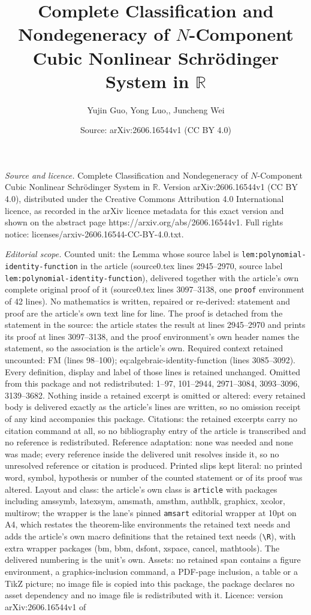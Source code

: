 \documentclass[10pt,a4paper]{amsart}
\title[Complete Classification and Nondegeneracy of $N$-Component C]{Complete Classification and Nondegeneracy of $N$-Component Cubic Nonlinear Schr\"{o}dinger System in ${\mathbb R}$}
\author{Yujin Guo, Yong Luo,, Juncheng Wei}
\date{Source: arXiv:2606.16544v1 (CC BY 4.0)}
\begin{document}
\maketitle

\noindent\emph{Source and licence.} Complete Classification and Nondegeneracy of $N$-Component Cubic Nonlinear Schr\"{o}dinger System in ${\mathbb R}$. Version arXiv:2606.16544v1 (CC BY 4.0), distributed under the Creative Commons Attribution 4.0 International licence, as recorded in the arXiv licence metadata for this exact version and shown on the abstract page https://arxiv.org/abs/2606.16544v1. Full rights notice: licenses/arxiv-2606.16544-CC-BY-4.0.txt.\par\smallskip

\noindent\textit{Editorial scope.} Counted unit: the Lemma whose source label is \texttt{lem:polynomial-identity-function} in the article (source0.tex lines 2945--2970, source label \texttt{lem:polynomial-identity-function}), delivered together with the article's own complete original proof of it (source0.tex lines 3097--3138, one \texttt{proof} environment of 42 lines). No mathematics is written, repaired or re-derived: statement and proof are the article's own text line for line. The proof is detached from the statement in the source: the article states the result at lines 2945--2970 and prints its proof at lines 3097--3138, and the proof environment's own header names the statement, so the association is the article's own. Required context retained uncounted: FM (lines 98--100); eq:algebraic-identity-function (lines 3085--3092). Every definition, display and label of those lines is retained unchanged. Omitted from this package and not redistributed: 1--97, 101--2944, 2971--3084, 3093--3096, 3139--3682. Nothing inside a retained excerpt is omitted or altered: every retained body is delivered exactly as the article's lines are written, so no omission receipt of any kind accompanies this package. Citations: the retained excerpts carry no citation command at all, so no bibliography entry of the article is transcribed and no reference is redistributed. Reference adaptation: none was needed and none was made; every reference inside the delivered unit resolves inside it, so no unresolved reference or citation is produced. Printed slips kept literal: no printed word, symbol, hypothesis or number of the counted statement or of its proof was altered. Layout and class: the article's own class is \texttt{article} with packages including amssymb, latexsym, amsmath, amsthm, authblk, graphicx, xcolor, multirow; the wrapper is the lane's pinned \texttt{amsart} editorial wrapper at 10pt on A4, which restates the theorem-like environments the retained text needs and adds the article's own macro definitions that the retained text needs (\texttt{\textbackslash R}), with extra wrapper packages (bm, bbm, dsfont, xspace, cancel, mathtools). The delivered numbering is the unit's own. Assets: no retained span contains a figure environment, a graphics-inclusion command, a PDF-page inclusion, a table or a TikZ picture; no image file is copied into this package, the package declares no asset dependency and no image file is redistributed with it. Licence: version arXiv:2606.16544v1 of 
\end{document}
